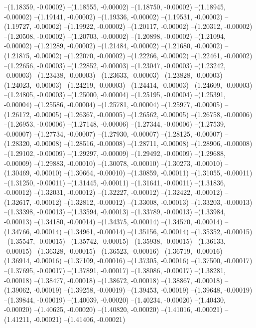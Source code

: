 --(1.18359, -0.00002)
--(1.18555, -0.00002)
--(1.18750, -0.00002)
--(1.18945, -0.00002)
--(1.19141, -0.00002)
--(1.19336, -0.00002)
--(1.19531, -0.00002)
--(1.19727, -0.00002)
--(1.19922, -0.00002)
--(1.20117, -0.00002)
--(1.20312, -0.00002)
--(1.20508, -0.00002)
--(1.20703, -0.00002)
--(1.20898, -0.00002)
--(1.21094, -0.00002)
--(1.21289, -0.00002)
--(1.21484, -0.00002)
--(1.21680, -0.00002)
--(1.21875, -0.00002)
--(1.22070, -0.00002)
--(1.22266, -0.00002)
--(1.22461, -0.00002)
--(1.22656, -0.00003)
--(1.22852, -0.00003)
--(1.23047, -0.00003)
--(1.23242, -0.00003)
--(1.23438, -0.00003)
--(1.23633, -0.00003)
--(1.23828, -0.00003)
--(1.24023, -0.00003)
--(1.24219, -0.00003)
--(1.24414, -0.00003)
--(1.24609, -0.00003)
--(1.24805, -0.00003)
--(1.25000, -0.00004)
--(1.25195, -0.00004)
--(1.25391, -0.00004)
--(1.25586, -0.00004)
--(1.25781, -0.00004)
--(1.25977, -0.00005)
--(1.26172, -0.00005)
--(1.26367, -0.00005)
--(1.26562, -0.00005)
--(1.26758, -0.00006)
--(1.26953, -0.00006)
--(1.27148, -0.00006)
--(1.27344, -0.00006)
--(1.27539, -0.00007)
--(1.27734, -0.00007)
--(1.27930, -0.00007)
--(1.28125, -0.00007)
--(1.28320, -0.00008)
--(1.28516, -0.00008)
--(1.28711, -0.00008)
--(1.28906, -0.00008)
--(1.29102, -0.00009)
--(1.29297, -0.00009)
--(1.29492, -0.00009)
--(1.29688, -0.00009)
--(1.29883, -0.00010)
--(1.30078, -0.00010)
--(1.30273, -0.00010)
--(1.30469, -0.00010)
--(1.30664, -0.00010)
--(1.30859, -0.00011)
--(1.31055, -0.00011)
--(1.31250, -0.00011)
--(1.31445, -0.00011)
--(1.31641, -0.00011)
--(1.31836, -0.00012)
--(1.32031, -0.00012)
--(1.32227, -0.00012)
--(1.32422, -0.00012)
--(1.32617, -0.00012)
--(1.32812, -0.00012)
--(1.33008, -0.00013)
--(1.33203, -0.00013)
--(1.33398, -0.00013)
--(1.33594, -0.00013)
--(1.33789, -0.00013)
--(1.33984, -0.00013)
--(1.34180, -0.00014)
--(1.34375, -0.00014)
--(1.34570, -0.00014)
--(1.34766, -0.00014)
--(1.34961, -0.00014)
--(1.35156, -0.00014)
--(1.35352, -0.00015)
--(1.35547, -0.00015)
--(1.35742, -0.00015)
--(1.35938, -0.00015)
--(1.36133, -0.00015)
--(1.36328, -0.00015)
--(1.36523, -0.00016)
--(1.36719, -0.00016)
--(1.36914, -0.00016)
--(1.37109, -0.00016)
--(1.37305, -0.00016)
--(1.37500, -0.00017)
--(1.37695, -0.00017)
--(1.37891, -0.00017)
--(1.38086, -0.00017)
--(1.38281, -0.00018)
--(1.38477, -0.00018)
--(1.38672, -0.00018)
--(1.38867, -0.00018)
--(1.39062, -0.00019)
--(1.39258, -0.00019)
--(1.39453, -0.00019)
--(1.39648, -0.00019)
--(1.39844, -0.00019)
--(1.40039, -0.00020)
--(1.40234, -0.00020)
--(1.40430, -0.00020)
--(1.40625, -0.00020)
--(1.40820, -0.00020)
--(1.41016, -0.00021)
--(1.41211, -0.00021)
--(1.41406, -0.00021)
